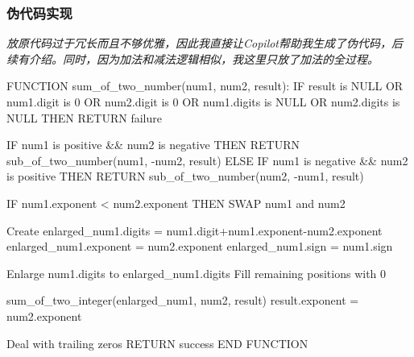 \documentclass[11pt]{article}
\begin{document}
\subsubsection{伪代码实现}
\textit{放原代码过于冗长而且不够优雅，因此我直接让Copilot帮助我生成了伪代码，后续有介绍。同时，因为加法和减法逻辑相似，我这里只放了加法的全过程。}
\begin{codeline}
FUNCTION sum_of_two_number(num1, num2, result):
    IF result is NULL OR num1.digit is 0 OR num2.digit is 0 OR
       num1.digits is NULL OR num2.digits is NULL THEN
        RETURN failure
    
    IF num1 is positive && num2 is negative THEN
        RETURN sub_of_two_number(num1, -num2, result)
    ELSE IF num1 is negative && num2 is positive THEN
        RETURN sub_of_two_number(num2, -num1, result)
    
    IF num1.exponent < num2.exponent THEN
        SWAP num1 and num2
    
    Create enlarged_num1.digits = num1.digit+num1.exponent-num2.exponent
    enlarged_num1.exponent = num2.exponent
    enlarged_num1.sign = num1.sign
    
    Enlarge num1.digits to enlarged_num1.digits
    Fill remaining positions with 0
    
    sum_of_two_integer(enlarged_num1, num2, result)
    result.exponent = num2.exponent

    Deal with trailing zeros
    RETURN success
END FUNCTION
\end{codeline}
\end{document}
